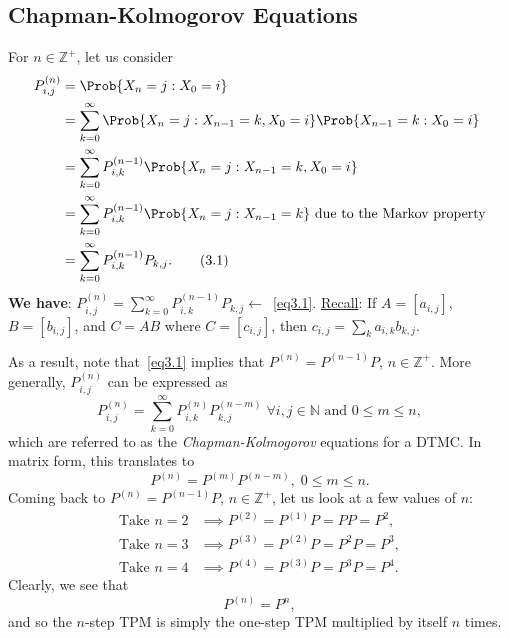 \subsection*{Chapman-Kolmogorov Equations}
\begin{Regular}
    For $ n\in\mathbb{Z}^+ $, let us consider
    \begin{align*}
        P_{i, j}^{(n)} & =\Prob{X_{n}=j \given X_{0}=i}                                                                           \\
                       & =\sum_{k=0}^{\infty} \Prob{X_{n}=j \given X_{n-1}=k, X_{0}=i} \Prob{X_{n-1}=k \given X_{0}=i}            \\
                       & =\sum_{k=0}^{\infty} P_{i, k}^{(n-1)} \Prob{X_{n}=j \given X_{n-1}=k, X_{0}=i}                           \\
                       & =\sum_{k=0}^{\infty} P_{i, k}^{(n-1)} \Prob{X_{n}=j \given X_{n-1}=k} \text{ due to the Markov property} \\
                       & =\sum_{k=0}^{\infty} P_{i,k}^{(n-1)} P_{k, j}.\label{eq3.1}\tag*{(3.1)}
    \end{align*}
    \textbf{We have}: $ P_{i,j}^{(n)}=\sum_{k=0}^{\infty} P_{i,k}^{(n-1)}P_{k,j}\leftarrow $~\ref{eq3.1}.
    \tcblower{}
    \underline{Recall}: If $ A=[a_{i,j}] $, $ B=[b_{i,j}] $, and $ C=AB $ where $ C=[c_{i,j}] $, then $ c_{i,j}=\sum_k a_{i,k}b_{k,j} $.

    As a result, note that~\ref{eq3.1} implies that $ P^{(n)}=P^{(n-1)}P $, $ n\in\mathbb{Z}^+ $. More generally, $ P_{i,j}^{(n)} $
    can be expressed as
    \[ P_{i,j}^{(n)}=\sum_{k=0}^{\infty} P_{i,k}^{(n)}P_{k,j}^{(n-m)}\; \forall i,j\in\mathbb{N}\text{ and }0\le m\le n, \]
    which are referred to as the \emph{Chapman-Kolmogorov} equations for a DTMC\@. In matrix form, this
    translates to
    \[ P^{(n)}=P^{(m)}P^{(n-m)},\; 0\le m\le n. \]
    Coming back to $ P^{(n)}=P^{(n-1)}P $, $ n\in\mathbb{Z}^+ $, let us look at a few values of $n$:
    \begin{align*}
        \text{Take }n=2 & \implies P^{(2)}=P^{(1)} P=P P=P^{2},     \\
        \text{Take }n=3 & \implies P^{(3)}=P^{(2)} P=P^{2} P=P^{3}, \\
        \text{Take }n=4 & \implies P^{(4)}=P^{(3)} P=P^{3} P=P^{4}.
    \end{align*}
    Clearly, we see that
    \[ P^{(n)}=P^n, \]
    and so the $ n $-step TPM is simply the one-step TPM multiplied by itself $ n $ times.
\end{Regular}

